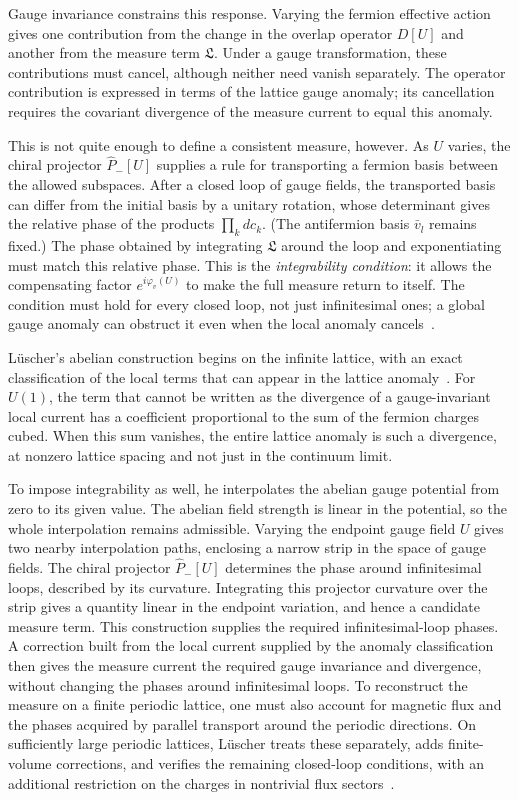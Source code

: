 \documentclass[11pt,a4paper]{article}
\theoremstyle{remark}
\begin{document}
Gauge invariance constrains this response. Varying the fermion effective action gives one contribution from the change in the overlap operator $D[U]$ and another from the measure term $\mathfrak L$. Under a gauge transformation, these contributions must cancel, although neither need vanish separately. The operator contribution is expressed in terms of the lattice gauge anomaly; its cancellation requires the covariant divergence of the measure current to equal this anomaly.

This is not quite enough to define a consistent measure, however. As $U$ varies, the chiral projector $\widehat P_-[U]$ supplies a rule for transporting a fermion basis between the allowed subspaces. After a closed loop of gauge fields, the transported basis can differ from the initial basis by a unitary rotation, whose determinant gives the relative phase of the products $\prod_k dc_k$. (The antifermion basis $\bar v_l$ remains fixed.) The phase obtained by integrating $\mathfrak L$ around the loop and exponentiating must match this relative phase. This is the \emph{integrability condition}: it allows the compensating factor $e^{i\varphi_v(U)}$ to make the full measure return to itself. The condition must hold for every closed loop, not just infinitesimal ones; a global gauge anomaly can obstruct it even when the local anomaly cancels~\cite{WittenSU2,BarCampos}.

L\"uscher's abelian construction begins on the infinite lattice, with an exact classification of the local terms that can appear in the lattice anomaly~\cite{LuscherAbelianTopology}. For $U(1)$, the term that cannot be written as the divergence of a gauge-invariant local current has a coefficient proportional to the sum of the fermion charges cubed. When this sum vanishes, the entire lattice anomaly is such a divergence, at nonzero lattice spacing and not just in the continuum limit.

To impose integrability as well, he interpolates the abelian gauge potential from zero to its given value. The abelian field strength is linear in the potential, so the whole interpolation remains admissible. Varying the endpoint gauge field $U$ gives two nearby interpolation paths, enclosing a narrow strip in the space of gauge fields. The chiral projector $\widehat P_-[U]$ determines the phase around infinitesimal loops, described by its curvature. Integrating this projector curvature over the strip gives a quantity linear in the endpoint variation, and hence a candidate measure term. This construction supplies the required infinitesimal-loop phases. A correction built from the local current supplied by the anomaly classification then gives the measure current the required gauge invariance and divergence, without changing the phases around infinitesimal loops. To reconstruct the measure on a finite periodic lattice, one must also account for magnetic flux and the phases acquired by parallel transport around the periodic directions. On sufficiently large periodic lattices, L\"uscher treats these separately, adds finite-volume corrections, and verifies the remaining closed-loop conditions, with an additional restriction on the charges in nontrivial flux sectors~\cite{LuscherAbelian}.
\end{document}
